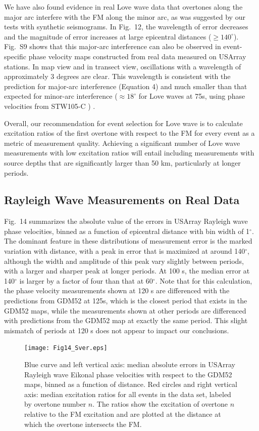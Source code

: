\documentclass[extra,mreferee]{gji}
\begin{document}
We have also found evidence in real Love wave data that overtones along the major arc interfere with the FM along the minor arc, as was suggested by our tests with synthetic seismograms. In Fig.\ 12, the wavelength of error decreases and the magnitude of error increases at large epicentral distances ($ \geq 140^\circ$). Fig.\ S9 shows that this major-arc interference can also be observed in event-specific phase velocity maps constructed from real data measured on USArray stations. In map view and in transect view, oscillations with a wavelength of approximately 3 degrees are clear. This wavelength is consistent with the prediction for major-arc interference (Equation 4) and much smaller than that expected for minor-arc interference ($\approx 18 ^\circ$ for Love waves at 75s, using phase velocities from STW105-C ) .     

Overall, our recommendation for event selection for Love wave is to calculate excitation ratios of the first overtone with respect to the FM for every event as a metric of measurement quality. Achieving a significant number of Love wave measurements with low excitation ratios will entail including measurements with source depths that are significantly larger than 50 km, particularly at longer periods. 


 \subsection{Rayleigh Wave Measurements on Real Data}

Fig.\ 14 summarizes the absolute value of the errors in USArray Rayleigh wave phase velocities, binned as a function of epicentral distance with bin width of 1$^\circ$. The dominant feature in these distributions of measurement error is the marked variation with distance, with a peak in error that is maximized at around 140$^\circ$, although the width and amplitude of this peak vary slightly between periods, with a larger and sharper peak at longer periods. At 100 s, the median error at 140$^\circ$ is larger by a factor of four than that at 60$^\circ$. Note that for this calculation, the phase velocity measurements shown at 120 s are differenced with the predictions from GDM52 at 125s, which is the closest period that exists in the GDM52 maps, while the measurements shown at other periods are differenced with predictions from the GDM52 map at exactly the same period. This slight mismatch of periods at 120 s does not appear to impact our conclusions.

\begin{figure}
\texttt{[image: Fig14\_Sver.eps]}
\caption{Blue curve and left vertical axis: median absolute errors in USArray Rayleigh wave Eikonal phase velocities with respect to the GDM52 maps, binned as a function of distance. Red circles and right vertical axis: median excitation ratios for all events in the data set, labeled by overtone number $n$. The ratios show the excitation of overtone $n$ relative to the FM excitation and are plotted at the distance at which the overtone intersects the FM. }
\end{figure}
\end{document}
